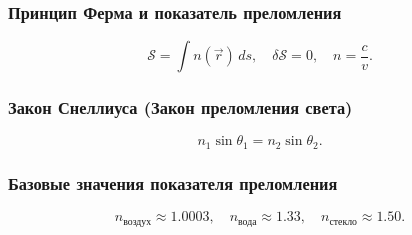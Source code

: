 \documentclass[12pt, a4paper]{article}
\begin{document}
\subsubsection*{Принцип Ферма и показатель преломления}
\[
\mathcal S=\int n(\vec r)\,ds, \quad \delta\mathcal S=0, \quad n=\frac{c}{v}.
\]

\subsubsection*{Закон Снеллиуса (Закон преломления света)}
\[
n_1\sin\theta_1 = n_2\sin\theta_2.
\]

\subsubsection*{Базовые значения показателя преломления}
\[
n_{\text{воздух}}\approx1.0003,\quad
n_{\text{вода}}\approx1.33,\quad
n_{\text{стекло}}\approx1.50.
\]
\end{document}
